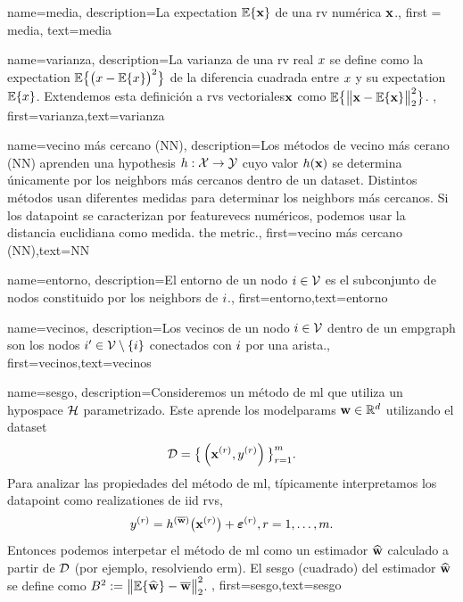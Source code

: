 {
	name=media,
	description={La \gls{expectation} $\mathbb{E} \{ {\bf x} \}$ de una \gls{rv} numérica ${\bf x}$.}, 
		first = {media}, text={media} 
}

{
	name={varianza},
	description={La varianza de una \gls{rv} real $x$ se define como la \gls{expectation} 
		$\mathbb{E}\big\{ \big( x - \mathbb{E}\{x \} \big)^{2} \big\}$ de la diferencia cuadrada entre $x$ 
		y su \gls{expectation} $\mathbb{E}\{x \}$. Extendemos esta definición a \gls{rv}s vectoriales${\bf x}$ 
		como $\mathbb{E}\big\{ \big\| {\bf x} - \mathbb{E}\{{\bf x} \} \big\|_{2}^{2} \big\}$.} ,
		first={varianza},text={varianza} 
}

{
	name={vecino más cercano (NN)},
	description={Los métodos de vecino más cerano (NN) aprenden una \gls{hypothesis} 
		$h: \mathcal{X} \rightarrow \mathcal{Y}$ cuyo valor $h({\bf x})$ 
		se determina únicamente por los \gls{neighbors} más cercanos dentro de un \gls{dataset}. Distintos 
		métodos usan diferentes medidas para determinar los \gls{neighbors} más cercanos. Si los \gls{datapoint}
		se caracterizan por \gls{featurevec}s numéricos, podemos usar la distancia euclidiana como medida.  
		the metric.},
	first={vecino más cercano (NN)},text={NN} 
}

{
	name={entorno},
	description={El entorno de un nodo $i \in \mathcal{V}$ es 
	el subconjunto de nodos constituido por los \gls{neighbors} de $i$.},
	first={entorno},text={entorno} 
}

{
	name={vecinos},
	description={Los vecinos de un nodo $i \in \mathcal{V}$ 
	dentro de un \gls{empgraph} son los nodos $i' \in \mathcal{V} \setminus \{ i\}$ conectados con $i$ por una arista.},
	first={vecinos},text={vecinos} 
}

{
	name={sesgo},
	description={Consideremos un método de \gls{ml} que utiliza un \gls{hypospace} $\mathcal{H}$ parametrizado. 
		Este aprende los \gls{modelparams} ${\bf w} \in \mathbb{R}^{d}$ utilizando el \gls{dataset} $$ \mathcal{D}=\big\{ \left( {\bf x}^{(r)},y^{(r)} \right) \big\}_{r=1}^{m}.$$ 
		Para analizar las propiedades del método de \gls{ml}, típicamente interpretamos los \gls{datapoint} como \gls{realization}es 
		de \gls{iid} \gls{rv}s, $$ y^{(r)} = h^{(\overline{{\bf w}})}\big( {\bf x}^{(r)} \big) + \bm{\varepsilon}^{(r)}, r=1,\ldots,m.$$ 
		Entonces podemos interpetar el método de \gls{ml} como un estimador $\widehat{{\bf w}}$ 
		calculado a partir de $\mathcal{D}$ (por ejemplo, resolviendo \gls{erm}). El sesgo (cuadrado) del estimador $\widehat{{\bf w}}$ 
		se define como $B^{2} := \big\| \mathbb{E} \{ \widehat{{\bf w}}  \}- \overline{{\bf w}}\big\|_{2}^{2}$. },
		first={sesgo},text={sesgo} 
}

